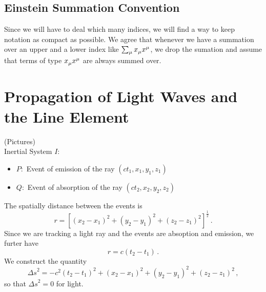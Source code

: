 \subsection{Einstein Summation Convention}
Since we will have to deal which many indices, we will find a way to keep
notation as compact as possible. We agree that whenever we have a summation over an
upper and a lower index like $\sum_\mu \tensor{x}{_\mu}\tensor{x}{^\mu}$, we
drop the sumation and assume that terms of type
$\tensor{x}{_\mu}\tensor{x}{^\mu}$ are always summed over.
\section{Propagation of Light Waves and the Line Element}
(Pictures)\\
Inertial System $I$: 
\begin{itemize}
  \item $P:$ Event of emission of the ray $(ct_1,x_1,y_1,z_1)$
  \item $Q:$ Event of absorption of the ray $(ct_2,x_2,y_2,z_2)$
\end{itemize}
The spatially distance between the events is
\begin{equation}
r=\left[(x_2-x_1)^2+(y_2-y_1)^2+(z_2-z_1)^2\right]^{\frac{1}{2}}\, .
\end{equation}
Since we are tracking a light ray and the events are absoption and emission, we
furter have
\begin{equation}
r=c(t_2-t_1)\, .
\end{equation}
We construct the quantity
\begin{equation}
{\Delta s}^2=-c^2(t_2-t_1)^2+(x_2-x_1)^2+(y_2-y_1)^2+(z_2-z_1)^2\, ,
\end{equation}
so that ${\Delta s}^2=0$ for light.

